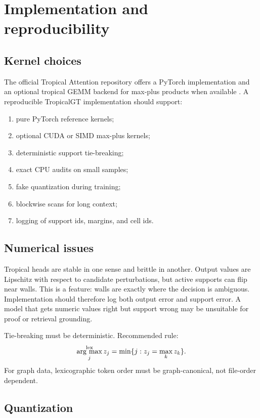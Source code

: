 \documentclass[11pt]{article}
\newcommand{\argmax}{\operatorname*{arg\ max}}
\begin{document}
\section{Implementation and reproducibility}

\subsection{Kernel choices}

The official Tropical Attention repository offers a PyTorch implementation and an optional tropical GEMM backend for max-plus products when available \cite{hashemi2025code}.  A reproducible TropicalGT implementation should support:
\begin{enumerate}
\item pure PyTorch reference kernels;
\item optional CUDA or SIMD max-plus kernels;
\item deterministic support tie-breaking;
\item exact CPU audits on small samples;
\item fake quantization during training;
\item blockwise scans for long context;
\item logging of support ids, margins, and cell ids.
\end{enumerate}

\subsection{Numerical issues}

Tropical heads are stable in one sense and brittle in another.  Output values are Lipschitz with respect to candidate perturbations, but active supports can flip near walls.  This is a feature: walls are exactly where the decision is ambiguous.  Implementation should therefore log both output error and support error.  A model that gets numeric values right but support wrong may be unsuitable for proof or retrieval grounding.

Tie-breaking must be deterministic.  Recommended rule:
\begin{equation}
\argmax^{\rm lex}_j z_j=\min\{j:z_j=\max_k z_k\}.
\end{equation}
For graph data, lexicographic token order must be graph-canonical, not file-order dependent.

\subsection{Quantization}
\end{document}
